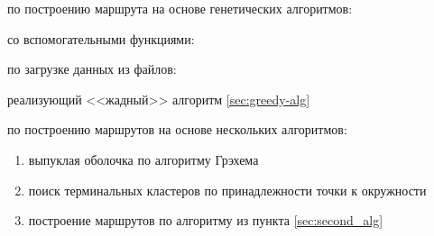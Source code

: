 \resumecontents
{}

 по построению маршрута на основе генетических алгоритмов:


\pagebreak

 со вспомогательными функциями:


 по загрузке данных из файлов:


\pagebreak

 реализующий <<жадный>> алгоритм \ref{sec:greedy-alg}


\pagebreak

 по построению маршрутов на основе нескольких алгоритмов:
\begin{enumerate}
    \item выпуклая оболочка по алгоритму Грэхема
    \item поиск терминальных кластеров по принадлежности точки к окружности
    \item построение маршрутов по алгоритму из пункта \ref{sec:second_alg}
\end{enumerate}
